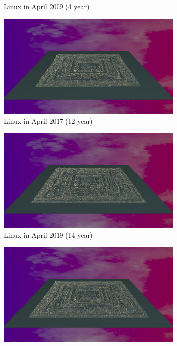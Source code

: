 \begin{figure}[ht]
\begin{subfigure}{0.48\textwidth}
        \caption{Linux in April 2009 (4 year)} 
        \label{fig:Linux_V7_S2}
    \end{subfigure}
    \medskip
    \begin{subfigure}{0.48\textwidth}
        \includegraphics[width=\linewidth]{Linux/Animation012.png}
        \caption{Linux in April 2017 (12 year)} 
        \label{fig:Linux_V7_S3}
    \end{subfigure}\hspace*{\fill}
    \begin{subfigure}{0.48\textwidth}
        \includegraphics[width=\linewidth]{Linux/Animation014.png}
        \caption{Linux in April 2019  (14 year)} 
        \label{fig:Linux_V7_S4}
    \end{subfigure}
    \medskip
    \begin{subfigure}{0.48\textwidth}
        \includegraphics[width=\linewidth]{Linux/Animation015.png}

\end{subfigure}
\end{figure}
